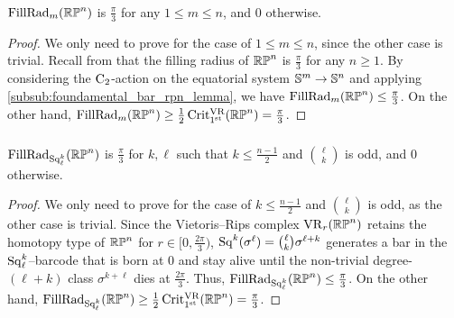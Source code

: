 \subsubsection{}
\label{subsub:beta_m_rpn}


\medskip\proposition
$\operatorname{FillRad}_{m}(\mathbb{RP}^n)$ is $\frac{\pi}{3}$ for any $1\leq m\leq n$, and $0$ otherwise.

\begin{proof}%
	We only need to prove for the case of $1\leq m\leq n$, since the other case is trivial.
    Recall from \cite{katz1983filling} that the filling radius of $\mathbb{RP}^n$ is $\frac{\pi}{3}$ for any $n \geq 1$.
	By considering the $\mathrm{C}_2$-action on the equatorial system $\mathbb{S}^m \to \mathbb{S}^n$ and applying \cref{subsub:foundamental_bar_rpn_lemma}, we have $\operatorname{FillRad}_{m}(\mathbb{RP}^n)\leq \tfrac{\pi}{3}$.
    On the other hand, $\operatorname{FillRad}_{m}(\mathbb{RP}^n)\geq \tfrac{1}{2}\operatorname{Crit^{\mathrm{VR}}_{1^{\mathrm{st}}}}(\mathbb{RP}^n) = \tfrac{\pi}{3}$.
\end{proof}

\subsubsection{}\label{subsub:gamma_rpn}

\medskip\proposition
$\operatorname{FillRad}_{\operatorname{Sq}_\ell^k}(\mathbb{RP}^n)$ is $\tfrac{\pi}{3}$ for $k, \ell$ such that $k \leq \frac{n-1}{2}$ and $\binom{\ell}{k}$ is odd, and $0$ otherwise.

\begin{proof}
	We only need to prove for the case of $k \leq \frac{n-1}{2}$ and $\binom{\ell}{k}$ is odd, as the other case is trivial.
    Since the Vietoris--Rips complex $\mathrm{VR}_r(\mathbb{RP}^n)$ retains the homotopy type of $\mathbb{RP}^n$ for $r \in [0,\tfrac{2\pi}{3})$, $\operatorname{Sq}^k(\sigma^\ell) = \binom{\ell}{k}\sigma^{\ell+k}$ generates a bar in the $\operatorname{Sq}^k_\ell$--barcode that is born at $0$ and stay alive until the non-trivial degree-$(\ell+k)$ class $\sigma^{k+\ell}$ dies at $\tfrac{2\pi}{3}$.
	Thus, $\operatorname{FillRad}_{\operatorname{Sq}_\ell^k}(\mathbb{RP}^n) \leq \tfrac{\pi}{3}$.
	On the other hand, $\operatorname{FillRad}_{\operatorname{Sq}_\ell^k}(\mathbb{RP}^n) \geq \tfrac{1}{2}\operatorname{Crit^{\mathrm{VR}}_{1^{\mathrm{st}}}}(\mathbb{RP}^n) = \tfrac{\pi}{3}$.
\end{proof}

\subsubsection{}\label{sub:barcode_rpn}

